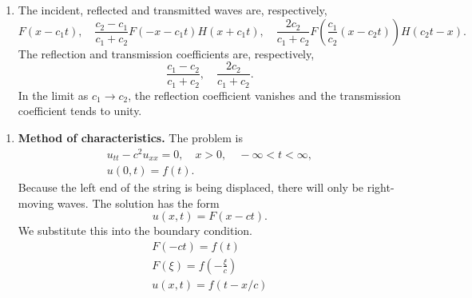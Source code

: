 {\begin{Solution}
\begin{enumerate}
\begin{gather*}
      \\
      - F(- t) + g(t) = - \frac{c_1}{c_2} f(- c_2 t / c_1) + a
    \end{gather*}
    We solve for $f$ for $x < c_2 t$ and for $g$ for $x > - c_1 t$.
    \[
    f(-c_2 t / c_1) = \frac{2 c_2}{c_1 + c_2} F(- t) + b, \qquad
    g(t) = \frac{c_2 - c_1}{c_1 + c_2} F(-t) + b
    \]
    By considering the case that the solution is continuous, $F(0) = 0$,
    we conclude that $b = 0$ since $f(0) = g(0) = 0$.
    \[
    f(t) = \frac{2 c_2}{c_1 + c_2} F(c_1 t / c_2), \qquad
    g(t) = \frac{c_2 - c_1}{c_1 + c_2} F(-t)
    \]
    Now we can write the solution for $u(x,t)$ for $t > 0$.
    \[
    u(x,t) = \begin{cases}
      F(x - c_1 t) + \frac{c_2 - c_1}{c_1 + c_2} F(- x - c_1 t) H(x + c_1 t), &x < 0 \\
      \frac{2 c_2}{c_1 + c_2} F \left(\frac{c_1}{c_2} (x - c_2 t) \right) H(c_2 t - x),
      &x > 0 
    \end{cases}
    \]
  \item 
    The incident, reflected and transmitted waves are, respectively,
    \[
    F(x - c_1 t), \quad 
    \frac{c_2 - c_1}{c_1 + c_2} F(- x - c_1 t) H(x + c_1 t), \quad
    \frac{2 c_2}{c_1 + c_2} F \left(\frac{c_1}{c_2} (x - c_2 t) \right) H(c_2 t - x).
    \]
    The reflection and transmission coefficients are, respectively,
    \[
    \frac{c_1 - c_2}{c_1 + c_2}, \quad
    \frac{2 c_2}{c_1 + c_2}.
    \]
    In the limit as $c_1 \to c_2$, the reflection coefficient vanishes and the 
    transmission coefficient tends to unity.
  \end{enumerate} 
\end{Solution}












\begin{Solution}
  \begin{enumerate}
  \item
    \textbf{Method of characteristics.}
    The problem is
    \begin{gather*}
      u_{t t} - c^2 u_{x x} = 0, \quad x > 0, \quad -\infty < t < \infty, 
      \\
      u(0, t) = f(t).
    \end{gather*}
    Because the left end of the string is being displaced, there will only 
    be right-moving waves.  The solution has the form
    \[
    u(x, t) = F(x - c t).
    \]
    We substitute this into the boundary condition.
    \begin{gather*}
      F(- c t) = f(t) 
      \\
      F(\xi) = f \left( - \frac{\xi}{c} \right)
      \\
      \boxed{
        u(x, t) = f(t - x/c)
        }
    \end{gather*}


\end{enumerate}
\end{Solution}}
